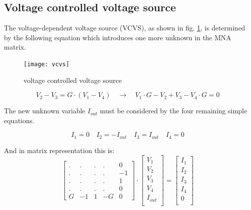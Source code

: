 \documentclass[10pt]{report}
\begin{document}
\subsection{Voltage controlled voltage source}

The voltage-dependent voltage source (VCVS), as shown in fig.
\ref{fig:vcvs}, is determined by the following equation which
introduces one more unknown in the MNA matrix.

\begin{figure}[ht]
\begin{center}
\texttt{[image: vcvs]}
\end{center}
\caption{voltage controlled voltage source}
\label{fig:vcvs}
\end{figure}
\FloatBarrier

\begin{equation}
V_{2} - V_{3} = G\cdot \left(V_{1} - V_{4}\right)
\quad \rightarrow \quad
V_{1}\cdot G - V_{2} + V_{3} - V_{4}\cdot G = 0
\label{eq:vcvs}
\end{equation}

The new unknown variable $I_{out}$ must be considered by the four
remaining simple equations.

\begin{equation}
I_{1} = 0 \quad I_{2} = -I_{out} \quad I_{3} = I_{out} \quad I_{4} = 0
\end{equation}

And in matrix representation this is:
\begin{equation}
\begin{bmatrix}
.&.&.&.& 0\\
.&.&.&.& -1\\
.&.&.&.& 1\\
.&.&.&.& 0\\
G & -1 & 1 & -G & 0
\end{bmatrix}
\cdot
\begin{bmatrix}
V_{1}\\
V_{2}\\
V_{3}\\
V_{4}\\
I_{out}\\
\end{bmatrix}
=
\begin{bmatrix}
I_{1}\\
I_{2}\\
I_{3}\\
I_{4}\\
0\\
\end{bmatrix}
\end{equation}
\end{document}

